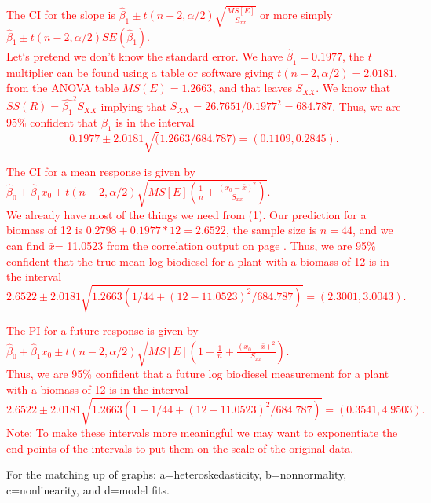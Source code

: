 \documentclass{article}
\begin{document}
\begin{enumerate}
\item \textcolor{red}{The CI for the slope is $\hat{\beta}_1 \pm t(n-2,\alpha/2) \sqrt{\frac{MS[E]}{S_{xx}}}$ or more simply $\hat{\beta}_1 \pm t(n-2,\alpha/2)SE(\hat{\beta}_1)$.  \\
Let`s pretend we don't know the standard error.  We have $\hat{\beta}_1=0.1977$, the $t$ multiplier can be found using a table or software giving $t(n-2,\alpha/2)=2.0181$, from the ANOVA table $MS(E)=1.2663$, and that leaves $S_{XX}$.  We know that $SS(R)=\hat{\beta_1}^2S_{XX}$ implying that $S_{XX}=26.7651/0.1977^2 = 684.787$.  Thus, we are 95\% confident that $\beta_1$ is in the interval
$$0.1977 \pm 2.0181\sqrt(1.2663/684.787)=(0.1109, 0.2845).$$
\item The CI for a mean response is given by $\hat\beta_0 +\hat\beta_1 x_0 \pm t(n-2,\alpha/2) \sqrt{MS[E]\left(\frac{1}{n}+\frac{(x_0-\bar{x})^2}{S_{xx}}\right)} $.  \\
We already have most of the things we need from (1).  Our prediction for a biomass of 12 is $0.2798+0.1977*12=2.6522$, the sample size is $n=44$, and we can find $\bar{x}$= 11.0523 from the correlation output on page \pageref{corrbio}.  Thus, we are 95\% confident that the true mean log biodiesel for a plant with a biomass of 12 is in the interval
$$2.6522 \pm 2.0181\sqrt{1.2663(1/44+(12-11.0523)^2/684.787)}=(2.3001,3.0043).$$
\item The PI for a future response is given by $\hat\beta_0 +\hat\beta_1 x_0 \pm t(n-2,\alpha/2) \sqrt{MS[E]\left(1+\frac{1}{n}+\frac{(x_0-\bar{x})^2}{S_{xx}}\right)} $.\\
Thus, we are 95\% confident that a future log biodiesel measurement for a plant with a biomass of 12 is in the interval
$$2.6522 \pm 2.0181\sqrt{1.2663(1+1/44+(12-11.0523)^2/684.787)}=(0.3541,4.9503).$$
Note: To make these intervals more meaningful we may want to exponentiate the end points of the intervals to put them on the scale of the original data.}
\end{enumerate}

For the matching up of graphs: a=heteroskedasticity, b=nonnormality, c=nonlinearity, and d=model fits.
\end{document}
